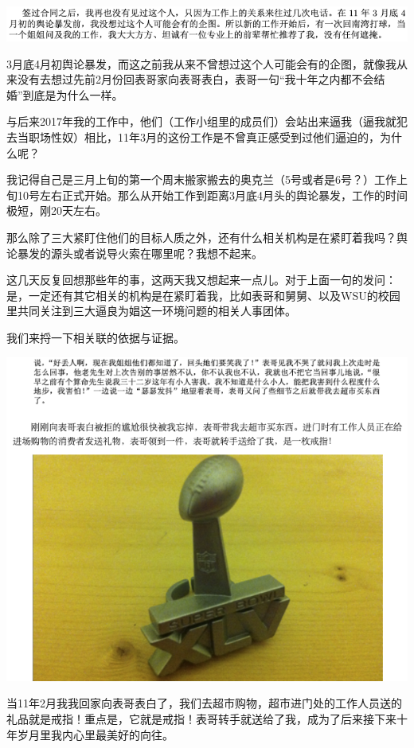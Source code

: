\documentclass[9pt, b5paper]{article}
\begin{document}
\begin{center}
\includegraphics[width=.9\linewidth]{./pic/backups_plans_20210412_104824.png}
\end{center}

3月底4月初舆论暴发，而这之前我从来不曾想过这个人可能会有的企图，就像我从来没有去想过先前2月份回表哥家向表哥表白，表哥一句“我十年之内都不会结婚”到底是为什么一样。 

与后来2017年我的工作中，他们（工作小组里的成员们）会站出来逼我（逼我就犯去当职场性奴）相比，11年3月的这份工作是不曾真正感受到过他们逼迫的，为什么呢？

我记得自己是三月上旬的第一个周末搬家搬去的奥克兰（5号或者是6号？）工作上旬10号左右正式开始。那么从开始工作到距离3月底4月头的舆论暴发，工作的时间极短，刚20天左右。

那么除了三大紧盯住他们的目标人质之外，还有什么相关机构是在紧盯着我吗？舆论暴发的源头或者说导火索在哪里呢？我想不起来。 

这几天反复回想那些年的事，这两天我又想起来一点儿。对于上面一句的发问：是，一定还有其它相关的机构是在紧盯着我，比如表哥和舅舅、以及WSU的校园里共同关注到三大逼良为娼这一环境问题的相关人事团体。

我们来捋一下相关联的依据与证据。

\begin{center}
\includegraphics[width=.9\linewidth]{./pic/backups_plans_20210414_103205.png}
\end{center}

当11年2月我我回家向表哥表白了，我们去超市购物，超市进门处的工作人员送的礼品就是戒指！重点是，它就是戒指！表哥转手就送给了我，成为了后来接下来十年岁月里我内心里最美好的向往。
\end{document}
